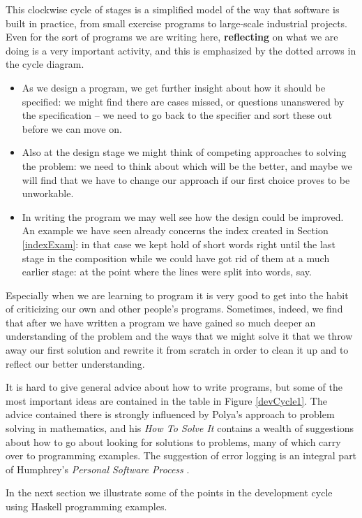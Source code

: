 This clockwise cycle of stages is a simplified model of the way that
software is built in practice, from small exercise programs to large-scale
industrial projects. Even for the sort of programs we are writing here,
\textbf{reflecting} on what we are doing is a very important activity, and this
is emphasized by the dotted arrows in the cycle diagram. 
\begin{itemize}
\item
As we design a
program, we get further insight about how it should be specified: we
might find there are cases missed, or questions unanswered by the
specification -- we need to go back to the specifier and sort these out
before we can move on.
\item 
Also at the design stage we might think of competing approaches to
solving the problem: we need to think about which will be the better,
and maybe we will find that we have to change our approach if our first choice
proves to be unworkable.
\item
In writing the program we may well see how the design could be improved.
An example we have seen already concerns the index created in Section
\ref{indexExam}: in that case we kept hold of short words right until
the last stage in the composition while we could have got rid of them at
a much earlier stage: at the point where the lines were split into
words, say.
\end{itemize}
Especially when we are learning to program it is very good to get into
the habit of criticizing our own and other people's programs. Sometimes,
indeed, we find that after we have written a program we have gained  so much
deeper an understanding of the problem and the ways that we might solve
it that we throw away our first solution and rewrite it from scratch in order to
clean it up and to reflect our better understanding.

It is hard to give general advice about how to write programs, but some
of the most important ideas are contained in  the table in Figure
\ref{devCycle1}. The advice contained there is
strongly influenced by Polya's approach to problem solving in
mathematics, and his {\em How To Solve It\/} \cite{HowToSolveIt} contains a wealth of
suggestions about how to go about looking for solutions to problems,
many of which carry over to programming examples. The suggestion of
error logging is an integral part of  Humphrey's {\em Personal Software
Process\/} \cite{psp}.

In the next section we illustrate some of the points in the development
cycle using Haskell programming examples.


